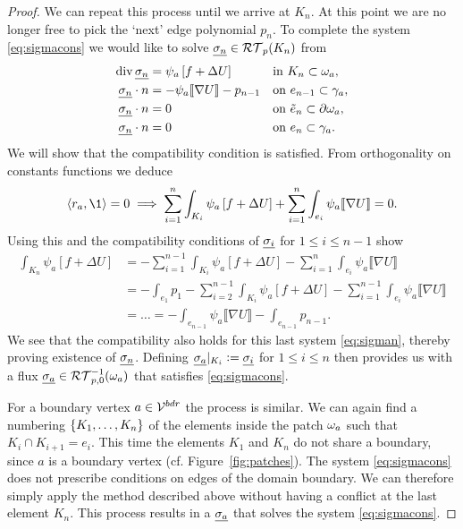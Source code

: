 \documentclass[thesis.tex]{subfiles}
\begin{document}
\begin{proof}
  We can repeat this process until we arrive at $K_n$. At this point we are no longer
  free to pick the `next'  edge polynomial $p_n$. To complete the system \eqref{eq:sigmacons} we would like to solve $\underline{\sigma_n} \in \mathcal{RT}_p(K_n)$
  from
  \begin{equation}
    \label{eq:sigman}
  \begin{alignedat}{3}
    \operatorname{div} \underline{\sigma_n} &= \psi_a \left [f + \Delta U\right] && \quad\text{in }  K_n\subset \omega_a ,\\
    \underline{\sigma_n} \cdot n  &= -\psi_a \llbracket \nabla U \rrbracket - p_{n-1} && \quad \text{on } e_{n-1} \subset \gamma_a,\\
    \underline{\sigma_n} \cdot n  &= 0 && \quad \text{on } \tilde e_n \subset \partial \omega_a,\\
    \underline{\sigma_n} \cdot n  &= 0 && \quad \text{on } e_{n} \subset \gamma_a.
  \end{alignedat}
\end{equation} 
  We will show that the compatibility condition is satisfied.
  From orthogonality on constants functions we deduce
  \[
    \ip{r_a, \1} = 0 \implies \sum_{i = 1}^n \int_{K_i} \psi_a \left[f+\Delta U\right] + \sum_{i = 1}^n \int_{e_i} \psi_a \llbracket \nabla U \rrbracket = 0.
  \]
  Using this and the compatibility conditions of $\underline{\sigma_i}$ for $1 \leq i \leq n-1$ show
  \begin{align*}
    \int_{K_n} \psi_a  \left[ f + \Delta U \right] &=- \sum_{i = 1}^{n-1} \int_{K_i} \psi_a \left[ f + \Delta U \right] - \sum_{i=1}^n \int_{e_i} \psi_a \llbracket \nabla U \rrbracket \\
    &=   - \int_{e_1} p_1 -  \sum_{i = 2}^{n-1} \int_{K_i} \psi_a \left[ f + \Delta U \right] - \sum_{i=1}^{n-1} \int_{e_i} \psi_a \llbracket \nabla U \rrbracket \\
    &= \dots =- \int_{e_{n-1}} \psi_a \llbracket \nabla U \rrbracket - \int_{e_{n-1}} p_{n-1}.
  \end{align*}
  We see that the compatibility also holds for this last system \eqref{eq:sigman}, thereby proving existence of $\underline{\sigma_n}$.
  Defining $\underline{\sigma_a}|_{K_i} := \underline{\sigma_i}$ for $1 \leq i \leq n$ then provides us with a flux $\underline{\sigma_a} \in \mathcal{RT}_{p,0}^{-1}(\omega_a)$ that satisfies \eqref{eq:sigmacons}.

  For a boundary vertex $a \in \mathcal{V}^{bdr}$ the process is similar.  We can again find a numbering $\set{K_1, \dots, K_n}$
  of the elements inside the patch $\omega_a$ such that $K_i \cap K_{i+1} = e_i$. This time the
  elements $K_1$ and $K_n$ do not share a boundary, since $a$ is a boundary vertex (cf. Figure~\ref{fig:patches}). 
  The system \eqref{eq:sigmacons} does not prescribe conditions on edges of the domain boundary.
  We can therefore simply apply the method described above without having a conflict at the last element $K_n$.
  This process results in a $\underline{\sigma_a}$ that solves the system \eqref{eq:sigmacons}.

  \end{proof}
\end{document}
